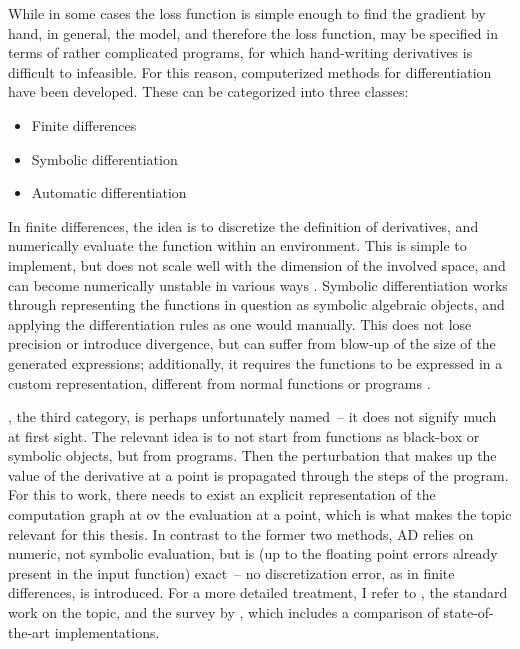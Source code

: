 While in some cases the loss function is simple enough to find the gradient by hand, in general, the
model, and therefore the loss function, may be specified in terms of rather complicated programs,
for which hand-writing derivatives is difficult to infeasible.  For this reason, computerized
methods for differentiation have been developed.  These can be categorized into three classes:
\begin{itemize}
  \firmlist
\item Finite differences
\item Symbolic differentiation
\item Automatic differentiation
\end{itemize}
In finite differences, the idea is to discretize the definition of derivatives, and numerically
evaluate the function within an environment.  This is simple to implement, but does not scale well
with the dimension of the involved space, and can become numerically unstable in various ways
\parencite[section 5.7]{press2007numerical}.  Symbolic differentiation works through representing
the functions in question as symbolic algebraic objects, and applying the differentiation rules as
one would manually.  This does not lose precision or introduce divergence, but can suffer from
blow-up of the size of the generated expressions; additionally, it requires the functions to be
expressed in a custom representation, different from normal functions or programs
\parencite{baydin2018automatic}.

, the third category, is perhaps unfortunately named~-- it
does not signify much at first sight.  The relevant idea is to not start from functions as black-box
or symbolic objects, but from programs.  Then the perturbation that makes up the value of the
derivative at a point is propagated through the steps of the program.  For this to work, there needs
to exist an explicit representation of the computation graph at ov the evaluation at a point, which
is what makes the topic relevant for this thesis.  In contrast to the former two methods, AD relies
on numeric, not symbolic evaluation, but is (up to the floating point errors already present in the
input function) exact~-- no discretization error, as in finite differences, is introduced.  For a
more detailed treatment, I refer to \textcite{griewank2008evaluating}, the standard work on the
topic, and the survey by \textcite{baydin2018automatic}, which includes a comparison of
state-of-the-art implementations.

